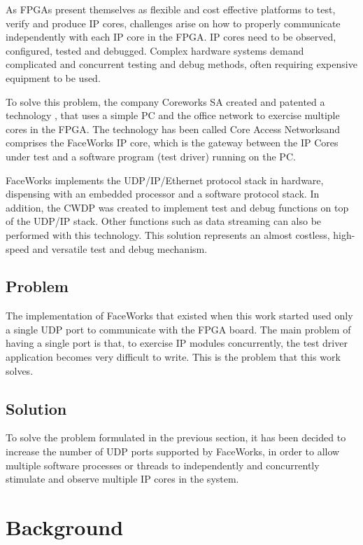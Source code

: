 \documentclass[conference]{IEEEtran}
\begin{document}
As FPGAs present themselves as flexible and cost effective platforms to test, verify and produce IP cores, challenges arise on how to properly communicate independently with each IP core in the FPGA. IP cores need to be observed, configured, tested and debugged. Complex hardware systems demand complicated and concurrent testing and debug methods, often requiring expensive equipment to be used.

To solve this problem, the company Coreworks SA created and patented a technology \cite[US 2008/0288652]{ncapat}, \cite[EP 2003571/A2]{ncapateu} that uses a simple PC and the office network to exercise multiple cores in the FPGA. The technology has been called Core Access Networks\textregistered and comprises the FaceWorks IP core, which is the gateway between the IP Cores under test and a software program (test driver) running on the PC.

FaceWorks implements the UDP/IP/Ethernet protocol stack in hardware, dispensing with an embedded processor and a software protocol stack. In addition, the CWDP was created to implement test and debug functions on top of the UDP/IP stack. Other functions such as data streaming can also be performed with this technology. This solution represents an almost costless, high-speed and versatile test and debug mechanism.

\subsection{Problem}

The implementation of FaceWorks that existed when this work started used only a single UDP port to communicate with the FPGA board. The main problem of having a single port is that, to exercise IP modules concurrently, the test driver application becomes very difficult to write. This is the problem that this work solves.

\subsection{Solution}

To solve the problem formulated in the previous section, it has been decided to increase the number of UDP ports supported by FaceWorks, in order to allow multiple software processes or threads to independently and concurrently stimulate and observe multiple IP cores in the system.

\section{Background}
\end{document}

